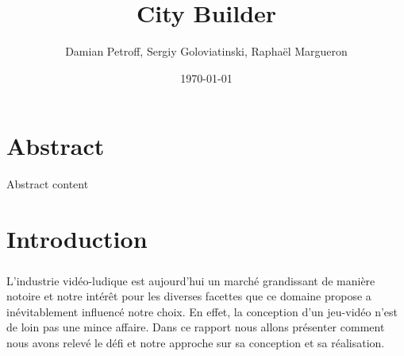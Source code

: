 \documentclass[a4paper,10pt,openany,oneside]{report}
\begin{document}
\begin{titlepage}
\title{City Builder}
\author{Damian Petroff, Sergiy Goloviatinski, Raphaël Margueron}
\date{\today}
\maketitle
\end{titlepage}

\thispagestyle{empty}
\pagebreak
\thispagestyle{empty}
\chapter*{Abstract}
\thispagestyle{empty}
Abstract content
\pagebreak
\thispagestyle{empty}
\tableofcontents
\thispagestyle{empty}
\chapter*{Introduction}
\setcounter{page}{1}
\paragraph{}
L'industrie vidéo-ludique est aujourd'hui un marché grandissant de manière notoire et notre intérêt pour les diverses facettes que ce domaine propose a inévitablement influencé notre choix.
En effet, la conception d'un jeu-vidéo n'est de loin pas une mince affaire. Dans ce rapport nous allons présenter comment nous avons relevé le défi et notre approche sur sa conception et sa réalisation.
\end{document}
